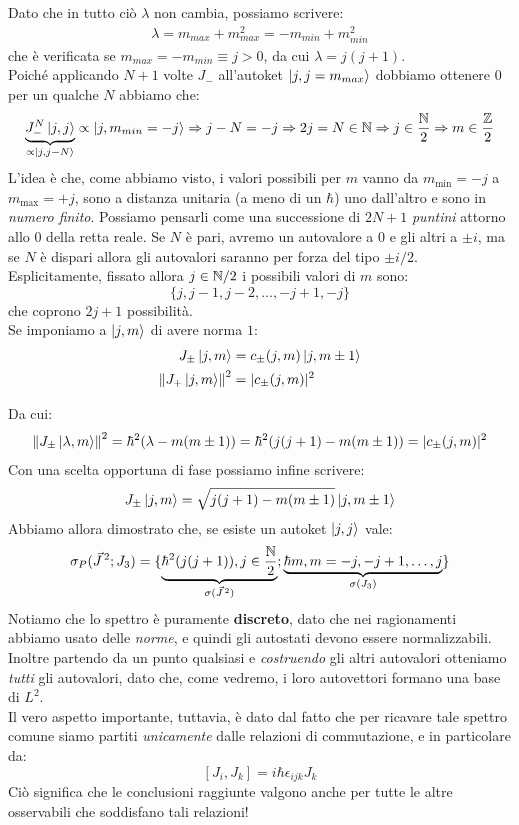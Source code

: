 \documentclass[../../FisicaTeorica.tex]{subfiles}
\begin{document}
Dato che in tutto ciò $\lambda$ non cambia, possiamo scrivere:
\begin{align*}
\lambda = m_{max} + m_{max}^2 = -m_{min} + m_{min}^2
\end{align*}
che è verificata se $m_{max}=-m_{min} \equiv j > 0$, da cui $\lambda=j(j+1)$.\\
Poiché applicando $N+1$ volte $J_-$ all'autoket $\Ket{j,j=m_{max}}$ dobbiamo ottenere $0$ per un qualche $N$ abbiamo che:
\[
\underbrace{J_-^N \Ket{j,j}}_{\propto \Ket{j, j-N}} \propto \Ket{j, m_{min} =-j} \Rightarrow  j-N = -j \Rightarrow  2j = N \in \mathbb{N} \Rightarrow  j \in \frac{\mathbb{N}}{2} \Rightarrow  m \in \frac{\mathbb{Z}}{2}
\]
L'idea è che, come abbiamo visto, i valori possibili per $m$ vanno da $m_{\min}=-j$ a $m_{\max}=+j$, sono a distanza unitaria (a meno di un $\hbar$) uno dall'altro e sono in \textit{numero finito}. Possiamo pensarli come una successione di $2N+1$ \textit{puntini}  attorno allo $0$ della retta reale. Se $N$ è pari, avremo un autovalore a $0$ e gli altri a $\pm i$, ma se $N$ è dispari allora gli autovalori saranno per forza del tipo $\pm i/2$.\\


Esplicitamente, fissato allora $j \in \mathbb{N}/2$ i possibili valori di $m$ sono:
\[
\{j, j-1, j-2, \dots, -j+1, -j\}
\]
che coprono $2j+1$ possibilità.\\
Se imponiamo a $\Ket{j,m}$ di avere norma $1$: %
\begin{align*}
J_\pm \Ket{j,m} &= c_\pm (j,m) \Ket{j, m\pm 1}\\
\left\lVert J_+ \Ket{j,m}\right\rVert^2&=|c_\pm (j,m)|^2
\end{align*}

Da cui:
\begin{align*}
\left\lVert J_\pm \Ket{\lambda,m}\right\rVert^2=\hbar^2(\lambda-m(m\pm 1)) =\hbar^2(j(j+1)-m(m\pm 1)) = |c_{\pm}(j,m)|^2
\end{align*}
Con una scelta opportuna di fase possiamo infine scrivere:
\[
J_\pm \Ket{j,m}=\sqrt{j(j+1)-m(m\pm 1)} \Ket{j, m\pm 1}
\]
Abbiamo allora dimostrato che, se esiste un autoket $\Ket{j,j}$  vale: 
\[
\sigma_P(\vec{J}^{\,2}; J_3) = \{\underbrace{ \hbar^2(j(j+1)), j\in \frac{\mathbb{N}}{2}}_{\sigma(\vec{J}^{\,2})}; \underbrace{\hbar m , m = -j, -j+1, \dots, j}_{\sigma(J_3)} \}
\]
Notiamo che lo spettro è puramente \textbf{discreto}, dato che nei ragionamenti abbiamo usato delle \textit{norme}, e quindi gli autostati devono essere normalizzabili. Inoltre partendo da un punto qualsiasi e \textit{costruendo} gli altri autovalori otteniamo \textit{tutti} gli autovalori, dato che, come vedremo, i loro autovettori formano una base di $L^2$.\\

Il vero aspetto importante, tuttavia, è dato dal fatto che per ricavare tale spettro comune siamo partiti \textit{unicamente} dalle relazioni di commutazione, e in particolare da:
\[
[J_i, J_k] = i\hbar \epsilon_{ijk} J_k
\]
Ciò significa che le conclusioni raggiunte valgono anche per tutte le altre osservabili che soddisfano tali relazioni! 
\end{document}
